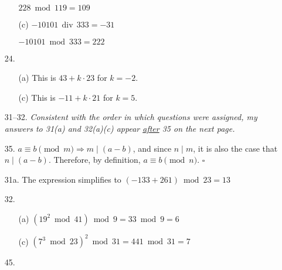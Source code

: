 \documentclass{article}
\begin{document}
\begin{enumerate}
\begin{itemize}
            $228 \bmod 119 = 109$
            \item[(c)] $-10101 \,\operatorname{div}\, 333 = -31$

            $-10101 \bmod 333 = 222$
        \end{itemize}
    \item[24.]
        \begin{itemize}
            \item[(a)]  This is $43+k \cdot 23$ for $k = -2$.
            \item[(c)]  This is $-11+k \cdot 21$ for $k = 5$.
        \end{itemize}
    \item[{\fontencoding{U}\fontfamily{futs}\selectfont\char 66\relax} 31--32.] \emph{Consistent with the order in which questions were assigned, my answers to 31(a) and 32(a)(c) appear \underline{after} 35 on the next page.}
    \item[35.] $a \equiv b \pmod m \Rightarrow m \mid (a-b)$, and since $n \mid m$, it is also the case that $n \mid (a-b)$. Therefore, by definition, $a \equiv b \pmod n$. $\square$
    \item[31a.] The expression simplifies to $(-133 + 261) \bmod 23 = \boxed{13}$
    \item[32.]
        \begin{itemize}
            \item[(a)] $(19^2 \bmod 41) \bmod 9 = 33 \bmod 9 = \boxed{6}$
            \item[(c)] $(7^3 \bmod 23)^2 \bmod 31 = 441 \bmod 31 = \boxed{7}$
        \end{itemize}
    \item[45.] \hfill


\end{enumerate}
\end{document}
